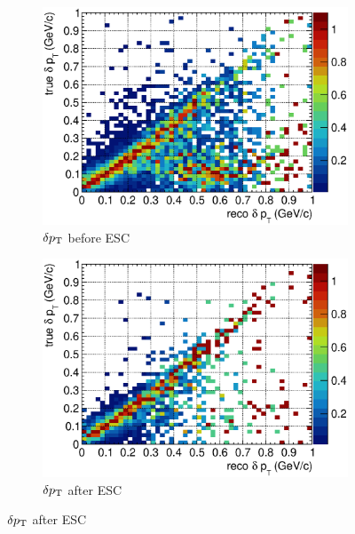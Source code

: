 \begin{figure}
\begin{subfigure}[b]{\dbfigwid\textwidth}
               \label{subfig:esc-dphit-afesc}
          \end{subfigure}
          \\
          \begin{subfigure}[b]{\dbfigwid\textwidth}
               \centering
               \includegraphics[width=\textwidth]{figures/perf/tki/dpt_colnor_resmat_al13.eps}
               \caption{$\delta p_\textrm{T}$ before ESC}
               \label{subfig:esc-dpt-bfesc}
          \end{subfigure}
          \begin{subfigure}[b]{\dbfigwid\textwidth}
               \centering
               \includegraphics[width=\textwidth]{figures/perf/tki/dpt_colnor_resmat_al14.eps}
               \caption{$\delta p_\textrm{T}$ after ESC}
               \label{subfig:esc-dpt-afesc}

\end{subfigure}
\end{figure}
